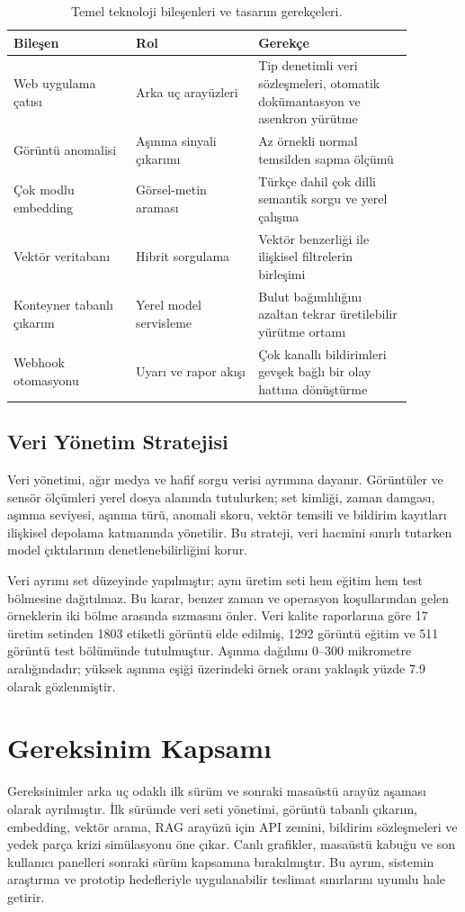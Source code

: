 \documentclass[conference]{IEEEtran}
\begin{document}
\begin{table}[H]
\centering
\caption{Temel teknoloji bileşenleri ve tasarım gerekçeleri.}
\label{tab:technology}
\begin{tabular}{p{0.27\linewidth}p{0.27\linewidth}p{0.34\linewidth}}
\toprule
Bileşen & Rol & Gerekçe \\
\midrule
Web uygulama çatısı & Arka uç arayüzleri & Tip denetimli veri sözleşmeleri, otomatik dokümantasyon ve asenkron yürütme \\
Görüntü anomalisi & Aşınma sinyali çıkarımı & Az örnekli normal temsilden sapma ölçümü \cite{patchcore2022} \\
Çok modlu embedding & Görsel-metin araması & Türkçe dahil çok dilli semantik sorgu ve yerel çalışma \cite{jina2024} \\
Vektör veritabanı & Hibrit sorgulama & Vektör benzerliği ile ilişkisel filtrelerin birleşimi \cite{pgvector2024} \\
Konteyner tabanlı çıkarım & Yerel model servisleme & Bulut bağımlılığını azaltan tekrar üretilebilir yürütme ortamı \\
Webhook otomasyonu & Uyarı ve rapor akışı & Çok kanallı bildirimleri gevşek bağlı bir olay hattına dönüştürme \\
\bottomrule
\end{tabular}
\end{table}

\subsection{Veri Yönetim Stratejisi}
Veri yönetimi, ağır medya ve hafif sorgu verisi ayrımına dayanır. Görüntüler ve sensör ölçümleri yerel dosya alanında tutulurken; set kimliği, zaman damgası, aşınma seviyesi, aşınma türü, anomali skoru, vektör temsili ve bildirim kayıtları ilişkisel depolama katmanında yönetilir. Bu strateji, veri hacmini sınırlı tutarken model çıktılarının denetlenebilirliğini korur.

Veri ayrımı set düzeyinde yapılmıştır; aynı üretim seti hem eğitim hem test bölmesine dağıtılmaz. Bu karar, benzer zaman ve operasyon koşullarından gelen örneklerin iki bölme arasında sızmasını önler. Veri kalite raporlarına göre 17 üretim setinden 1803 etiketli görüntü elde edilmiş, 1292 görüntü eğitim ve 511 görüntü test bölümünde tutulmuştur. Aşınma dağılımı 0--300 mikrometre aralığındadır; yüksek aşınma eşiği üzerindeki örnek oranı yaklaşık yüzde 7.9 olarak gözlenmiştir.

\section{Gereksinim Kapsamı}
Gereksinimler arka uç odaklı ilk sürüm ve sonraki masaüstü arayüz aşaması olarak ayrılmıştır. İlk sürümde veri seti yönetimi, görüntü tabanlı çıkarım, embedding, vektör arama, RAG arayüzü için API zemini, bildirim sözleşmeleri ve yedek parça krizi simülasyonu öne çıkar. Canlı grafikler, masaüstü kabuğu ve son kullanıcı panelleri sonraki sürüm kapsamına bırakılmıştır. Bu ayrım, sistemin araştırma ve prototip hedefleriyle uygulanabilir teslimat sınırlarını uyumlu hale getirir.
\end{document}
